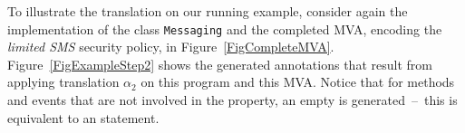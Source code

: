 
To illustrate the translation on our running example, consider again
the implementation of the class \texttt{Messaging} and the completed
MVA, encoding the \emph{limited SMS} security policy, in
Figure~\ref{FigCompleteMVA}. Figure~\ref{FigExampleStep2} shows the
generated annotations that result from applying translation
\(\alpha_2\) on this program and this MVA.
Notice that for methods
and events that are not involved in the property, an empty \CaseJML is
generated~--~this is equivalent to an \Skip statement.

